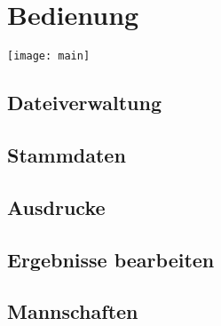 \chapter{Bedienung}

\texttt{[image: main]}

\section{Dateiverwaltung}

\section{Stammdaten}

\section{Ausdrucke}

\section{Ergebnisse bearbeiten}

\section{Mannschaften}